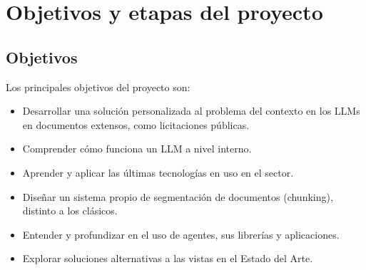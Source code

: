 \section{Objetivos y etapas del proyecto}
\subsection{Objetivos}
Los principales objetivos del proyecto son:  
\begin{itemize}
    \item Desarrollar una solución personalizada al problema del contexto en los LLMs en documentos extensos, como licitaciones públicas.
    \item Comprender cómo funciona un LLM a nivel interno.
    \item Aprender y aplicar las últimas tecnologías en uso en el sector.
    \item Diseñar un sistema propio de segmentación de documentos (chunking), distinto a los clásicos.
    \item Entender y profundizar en el uso de agentes, sus librerías y aplicaciones.
    \item Explorar soluciones alternativas a las vistas en el Estado del Arte.
\end{itemize}

